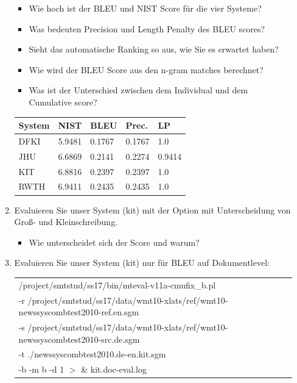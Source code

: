 \documentclass[12pt,fleqn]{article}
\begin{document}
\begin{enumerate}
\begin{enumerate}
\vspace{0.5cm} 
\begin{itemize} 
\item Wie hoch ist der BLEU und NIST Score für die vier Systeme?
\item Was bedeuten Precision und Length Penalty des BLEU scores?
\item Sieht das automatische Ranking so aus, wie Sie es erwartet haben?
\item Wie wird der BLEU Score aus den n-gram matches berechnet?
\item Was ist der Unterschied zwischen dem Individual und dem Cumulative score?
\end{itemize} 

\begin{table}[h] 
 \begin{center} 
\begin{tabular}{|p{2cm}|p{2.5cm}|p{2.5cm}|p{2.5cm}|p{2.5cm}|} \hline 
 System & NIST & BLEU & Prec. & LP \\  \hline 
DFKI & 5.9481 & 0.1767 & 0.1767  & 1.0 \\ \hline 
JHU & 6.6869 & 0.2141 & 0.2274 & 0.9414 \\ \hline 
KIT & 6.8816 & 0.2397 & 0.2397 & 1.0  \\ \hline 
RWTH & 6.9411 & 0.2435  & 0.2435 & 1.0 \\ \hline 
\end{tabular}
 \end{center}
\end{table}

\vspace{0.5cm} 
\item Evaluieren Sie unser System (kit) mit der Option mit Unterscheidung von Groß- und Kleinschreibung.

\vspace{0.5cm} 
\begin{itemize} 
\item Wie unterscheidet sich der Score und warum?
\end{itemize} 

\vspace{0.5cm} 
\item Evaluieren Sie unser System (kit) nur für BLEU auf Dokumentlevel:

\begin{table}[h] 
 \begin{center} 
\begin{tabular}{l} 
/project/smtstud/ss17/bin/mteval-v11a-cmufix\_b.pl  \\ 
-r /project/smtstud/ss17/data/wmt10-xlats/ref/wmt10-newssyscombtest2010-ref.en.sgm  \\ 
-s /project/smtstud/ss17/data/wmt10-xlats/ref/wmt10-newssyscombtest2010-src.de.sgm  \\ 
-t ./newssyscombtest2010.de-en.kit.sgm  \\ 
-b -m b -d 1    $>$ \&  kit.doc-eval.log \\ 
\end{tabular}
 \end{center}
\end{table}



\end{enumerate}
\end{enumerate}
\end{document}
